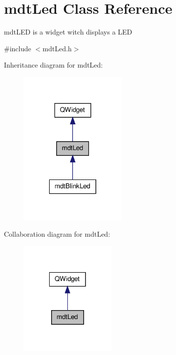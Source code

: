 \hypertarget{classmdt_led}{\section{mdt\-Led Class Reference}
\label{classmdt_led}
}


mdt\-L\-E\-D is a widget witch displays a L\-E\-D  




{\ttfamily \#include $<$mdt\-Led.\-h$>$}



Inheritance diagram for mdt\-Led\-:
\nopagebreak
\begin{figure}[H]
\begin{center}
\leavevmode
\includegraphics[width=150pt]{classmdt_led__inherit__graph}
\end{center}
\end{figure}


Collaboration diagram for mdt\-Led\-:
\nopagebreak
\begin{figure}[H]
\begin{center}
\leavevmode
\includegraphics[width=134pt]{classmdt_led__coll__graph}
\end{center}
\end{figure}
